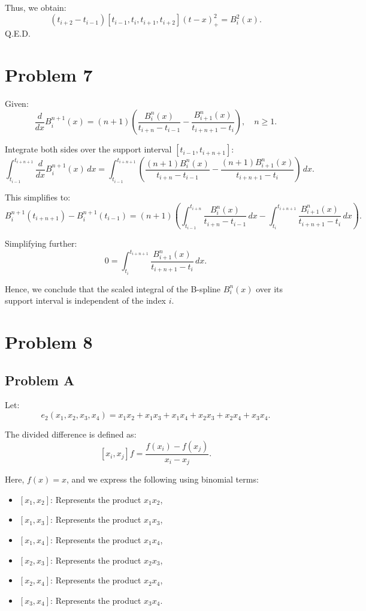\documentclass{article}
\begin{document}
Thus, we obtain:
\[
(t_{i+2} - t_{i-1})[t_{i-1}, t_i, t_{i+1}, t_{i+2}] (t - x)^2_+ = B_i^2(x).
\]
Q.E.D.



\section{Problem 7}
Given:
\[
\frac{d}{dx} B_i^{n+1}(x) = (n+1) \left( \frac{B_i^n(x)}{t_{i+n} - t_{i-1}} - \frac{B_{i+1}^n(x)}{t_{i+n+1} - t_i} \right), \quad n \geq 1.
\]

Integrate both sides over the support interval \( [t_{i-1}, t_{i+n+1}] \):
\[
\int_{t_{i-1}}^{t_{i+n+1}} \frac{d}{dx} B_i^{n+1}(x) \, dx = \int_{t_{i-1}}^{t_{i+n+1}} \left( \frac{(n+1) B_i^n(x)}{t_{i+n} - t_{i-1}} - \frac{(n+1) B_{i+1}^n(x)}{t_{i+n+1} - t_i} \right) \, dx.
\]

This simplifies to:
\[
B_i^{n+1}(t_{i+n+1}) - B_i^{n+1}(t_{i-1}) = (n+1) \left( \int_{t_{i-1}}^{t_{i+n}} \frac{B_i^n(x)}{t_{i+n} - t_{i-1}} \, dx - \int_{t_i}^{t_{i+n+1}} \frac{B_{i+1}^n(x)}{t_{i+n+1} - t_i} \, dx \right).
\]

Simplifying further:
\[
0 = \int_{t_i}^{t_{i+n+1}} \frac{B_{i+1}^n(x)}{t_{i+n+1} - t_i} \, dx.
\]

Hence, we conclude that the scaled integral of the B-spline \( B_i^n(x) \) over its support interval is independent of the index \( i \).


\section{Problem 8}
\subsection{Problem A}
Let:
\[
e_2(x_1, x_2, x_3, x_4) = x_1x_2 + x_1x_3 + x_1x_4 + x_2x_3 + x_2x_4 + x_3x_4.
\]

The divided difference is defined as:
\[
[x_i, x_j]f = \frac{f(x_i) - f(x_j)}{x_i - x_j}.
\]

Here, \( f(x) = x \), and we express the following using binomial terms:
\begin{itemize}
    \item \( [x_1, x_2] \): Represents the product \( x_1 x_2 \),
    \item \( [x_1, x_3] \): Represents the product \( x_1 x_3 \),
    \item \( [x_1, x_4] \): Represents the product \( x_1 x_4 \),
    \item \( [x_2, x_3] \): Represents the product \( x_2 x_3 \),
    \item \( [x_2, x_4] \): Represents the product \( x_2 x_4 \),
    \item \( [x_3, x_4] \): Represents the product \( x_3 x_4 \).
\end{itemize}
\end{document}
